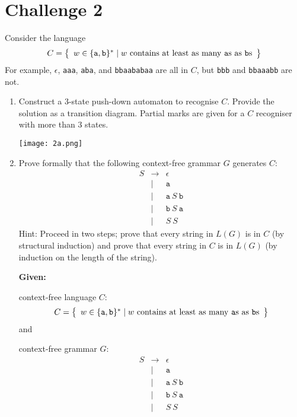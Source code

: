 \documentclass[11pt]{article}
\newcommand{\set}[1]{\left\{
    \begin{array}{l}#1
    \end{array}
  \right\}}
\begin{document}
\section*{Challenge 2}
Consider the language
\[
  C = \set{w \in \{\texttt{a},\texttt{b}\}^* \mid
        \mbox{$w$ contains at least as many \texttt{a}s as \texttt{b}s}}
\]
For example, $\epsilon$, \verb!aaa!, \verb!aba!, and \verb!bbaababaa! 
are all in $C$,
but \verb!bbb! and \verb!bbaaabb! are not.
\begin{enumerate}
\item
Construct a 3-state push-down automaton to recognise $C$.
Provide the solution as a transition diagram.
Partial marks are given for a $C$ recogniser with more than 3 states.

\texttt{[image: 2a.png]} \\

\item
Prove formally that the following context-free grammar $G$ generates $C$:
\[
\begin{array}{lrl}
   S & \rightarrow
     & \epsilon 
\\   & \mid
     & \texttt{a} 
\\   & \mid
     & \texttt{a}\ S\ \texttt{b} 
\\   & \mid
     & \texttt{b}\ S\ \texttt{a} 
\\   & \mid
     & S\ S
\end{array}
\]
Hint: Proceed in two steps;
prove that every string in $L(G)$ is in $C$
(by structural induction) 
and prove that every string in $C$ is in $L(G)$
(by induction on the length of the string).

\textbf{Given:} 

context-free language $C$: 
\[
  C = \set{w \in \{\texttt{a},\texttt{b}\}^* \mid
        \mbox{$w$ contains at least as many \texttt{a}s as \texttt{b}s}}
\]
and

context-free grammar $G$:
\[
\begin{array}{lrl}
   S & \rightarrow
     & \epsilon 
\\   & \mid
     & \texttt{a} 
\\   & \mid
     & \texttt{a}\ S\ \texttt{b} 
\\   & \mid
     & \texttt{b}\ S\ \texttt{a} 
\\   & \mid
     & S\ S
\end{array}
\]


\end{enumerate}
\end{document}
